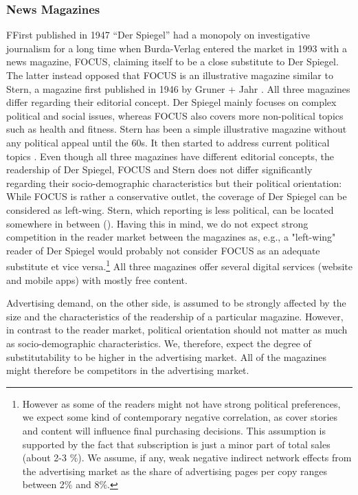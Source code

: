 \documentclass[12pt,a4paper,notitlepage]{article}
\begin{document}
\subsubsection{News Magazines} 
FFirst published in 1947 ``Der Spiegel'' had a monopoly on investigative journalism for a long time when Burda-Verlag entered the market in 1993 with a news magazine, FOCUS, claiming itself to be a close substitute to Der Spiegel. The latter instead opposed that FOCUS is an illustrative magazine similar to Stern, a magazine first published in 1946 by Gruner + Jahr \citep{kaltenhaeuser_abstimmung_2005}. All three magazines differ regarding their editorial concept. Der Spiegel mainly focuses on complex political and social issues, whereas FOCUS also covers more non-political topics such as health and fitness. Stern has been a simple illustrative magazine without any political appeal until the 60s. It then started to address current political topics \citep{vogel_populaere_1998}. Even though all three magazines have different editorial concepts, the readership of Der Spiegel, FOCUS and Stern does not differ significantly regarding their socio-demographic characteristics but their political orientation: While FOCUS is rather a conservative outlet, the coverage of Der Spiegel can be considered as left-wing. Stern, which reporting is less political, can be located somewhere in between (\citet{kaltenhaeuser_abstimmung_2005}). Having this in mind, we do not expect strong competition in the reader market between the magazines as, e.g., a "left-wing" reader of Der Spiegel would probably not consider FOCUS as an adequate substitute et vice versa.\footnote{However as some of the readers might not have strong political preferences, we expect some kind of contemporary negative correlation, as cover stories and content will influence final purchasing decisions. This assumption is supported by the fact that subscription is just a minor part of total sales (about 2-3 $\%$). We assume, if any, weak negative indirect network effects from the advertising market as the share of advertising pages per copy ranges between 2$\%$ and 8$\%$.} All three magazines offer several digital services (website and mobile apps) with mostly free content. 

Advertising demand, on the other side, is assumed to be strongly affected by the size and the characteristics of the readership of a particular magazine. However, in contrast to the reader market, political orientation should not matter as much as socio-demographic characteristics. We, therefore, expect the degree of substitutability to be higher in the advertising market. All of the magazines might therefore be competitors in the advertising market.  
\end{document}

